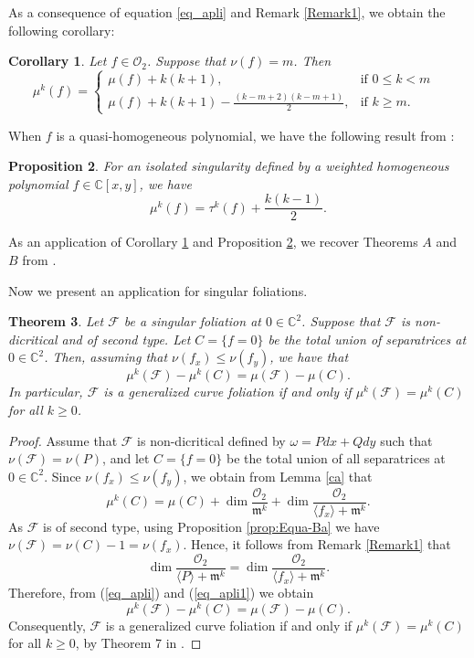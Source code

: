 \documentclass[12pt,letterpaper]{amsart}
\newcommand{\C}{\mathbb{C}}
\newcommand{\F}{\mathcal{F}}
\newcommand{\m}{\mathfrak{m}}
\newtheorem{theorem}{Theorem}[section]
\newtheorem{proposition}[theorem]{Proposition}
\newtheorem{corollary}[theorem]{Corollary}
\begin{document}
\noindent As a consequence of equation \ref{eq_apli} and Remark \ref{Remark1}, we obtain the following corollary:
\begin{corollary}\label{mk}
Let $f\in\mathcal{O}_2$. Suppose that $\nu(f)=m$. Then
\[\mu^k(f)=\begin{cases}
			\mu(f)+k(k+1), & \text{if $0\leq k< m$ }\\
            \mu(f)+k(k+1)-\frac{(k-m+2)(k-m+1)}{2}, & \text{if $k\geq m$.}
		 \end{cases}\]
\end{corollary}

\noindent When $f$ is a quasi-homogeneous polynomial, we have the following result from \cite[Proposition 2.6]{k-Milnor}:
\begin{proposition}\label{prop_hussain}
    For an isolated singularity defined by a weighted homogeneous polynomial $f\in\C[x,y]$, we have
    \[\mu^k(f)=\tau^k(f)+\frac{k(k-1)}{2}.\]
\end{proposition}

\noindent As an application of Corollary \ref{mk} and Proposition \ref{prop_hussain}, we recover Theorems $A$ and $B$ from \cite{k-Milnor}.

\medskip
\noindent Now we present an application for singular foliations. 
\begin{theorem}
    Let $\F$ be a singular foliation at $0\in\C^2$. Suppose that $\F$ is non-dicritical and of second type. Let $C=\{f=0\}$ be the total union of separatrices at $0\in\C^2$. Then, assuming that $\nu(f_x)\leq\nu(f_y)$, we have that 
    \[
\mu^{k}(\F)-\mu^{k}(C)=\mu(\F)-\mu(C).
\]
In particular, $\F$ is a generalized curve foliation if and only if $\mu^{k}(\F)=\mu^{k}(C)$ for all $k\geq 0$.
\end{theorem}

\begin{proof}
Assume that $\F$ is non-dicritical defined by $\omega=Pdx+Qdy$ such that $\nu(\F)=\nu(P)$, and let $C=\{f=0\}$ be the total union of all separatrices at $0\in\C^2$.  
Since $\nu(f_x)\leq\nu(f_y)$, we obtain from Lemma \ref{ca} that
\begin{equation}\label{eq_apli1}
\mu^{k}(C)=\mu(C)+\dim\frac{\mathcal{O}_2}{\m^{k}}+\dim\frac{\mathcal{O}_2}{\langle f_x\rangle+\m^{k}}.
\end{equation}
As $\F$ is of second type, using Proposition \ref{prop:Equa-Ba} we have 
$\nu(\F)=\nu(C)-1=\nu(f_x)$. Hence, it follows from Remark \ref{Remark1} that
\[
\dim\frac{\mathcal{O}_2}{\langle P\rangle+\m^{k}}=\dim\frac{\mathcal{O}_2}{\langle f_x\rangle+\m^{k}}.
\]
Therefore, from (\ref{eq_apli}) and (\ref{eq_apli1}) we obtain
\[
\mu^{k}(\F)-\mu^{k}(C)=\mu(\F)-\mu(C).
\]
Consequently, $\F$ is a generalized curve foliation if and only if $\mu^{k}(\F)=\mu^{k}(C)$ for all $k\geq 0$, by Theorem 7 in \cite{CLS}.
\end{proof}
\end{document}
